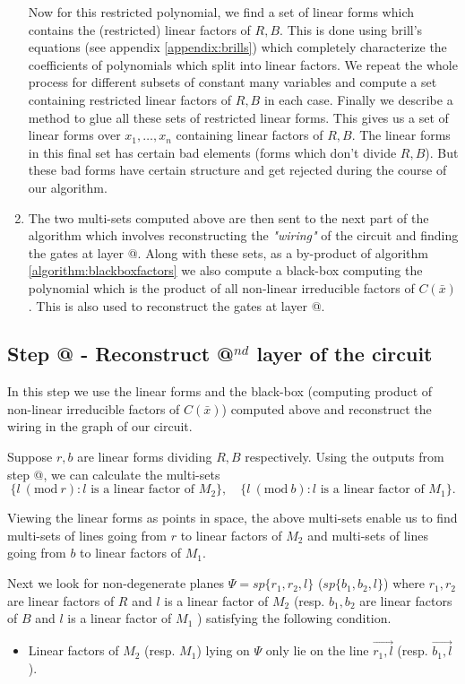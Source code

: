 \documentclass[12pt]{caltech_thesis}
\makeatletter
\newcommand{\Mod}[1]{\ (\text{mod}\ #1)}
\theoremstyle{plain}
\theoremstyle{definition}
\newcommand{\B}[1]{\bar{#1}}
\newcommand*{\rom}[1]{\expandafter\@slowromancap\romannumeral #1@}
\makeatother
\begin{document}
\begin{enumerate}
 Now for this restricted polynomial, we find a  set of linear forms which 
 contains the (restricted) linear factors of $R,B$. This is done using brill's equations (see appendix 
 \ref{appendix:brills}) which completely characterize the coefficients of polynomials which split into linear factors. We repeat the whole
 process for different subsets of constant many variables and compute a set containing restricted linear factors of $R,B$ in each case. 
 Finally we describe a method to glue all these sets of restricted linear forms. 
 This gives us a set of linear forms over $x_1,\ldots,x_n$ containing linear factors of $R,B$. The linear forms in this final set has
 certain bad elements (forms which don't divide $R,B$). But these bad forms have certain structure and get rejected during the course 
 of our algorithm.
 
 \item The two multi-sets computed above are then sent to the next part of the algorithm which involves reconstructing 
 the \emph{"wiring"} of the circuit and finding the gates at layer \rom{2}. Along with these sets, as a by-product of algorithm \ref{algorithm:blackboxfactors}
 we also compute a black-box computing the polynomial which is the product of all non-linear irreducible factors of $C(\B{x})$.
 This is also used to reconstruct the gates at layer \rom{2}.
\end{enumerate}


\subsection{Step \rom{2} - Reconstruct \rom{2}$^{nd}$ layer of the circuit}
In this step we use the linear forms and the black-box (computing product of non-linear irreducible 
factors of $C(\B{x})$) computed above and reconstruct the wiring in the graph of our circuit. 

Suppose $r,b$ are linear forms dividing $R,B$ respectively. Using the outputs from step \rom{1}, we can calculate the multi-sets 
\[ \{l\Mod{r} : l\text{ is a linear factor of } M_2  \},\hspace{1em} \{l\Mod{b} : l\text{ is a linear factor of } M_1  \}.
\] 

Viewing the linear forms as points in space, the above multi-sets enable us to find multi-sets of lines going from $r$ to linear factors of $M_2$
and multi-sets of lines going from $b$ to linear factors of $M_1$.

Next we look for non-degenerate planes $\Psi = sp\{r_1,r_2,l\}$ ($sp\{b_1,b_2,l\}$) where $r_1,r_2$ are linear factors of $R$ and
$l$ is a linear factor of $M_2$ (resp. $b_1,b_2$
are linear factors of $B$ and $l$ is a linear factor of $M_1$ ) satisfying the following condition. 
\begin{itemize}
 \item Linear factors of $M_2$ (resp. $M_1$) lying on $\Psi$ only lie on the line $\overrightarrow{r_1,l}$ (resp. $\overrightarrow{b_1,l}$). 
\end{itemize}
\end{document}
